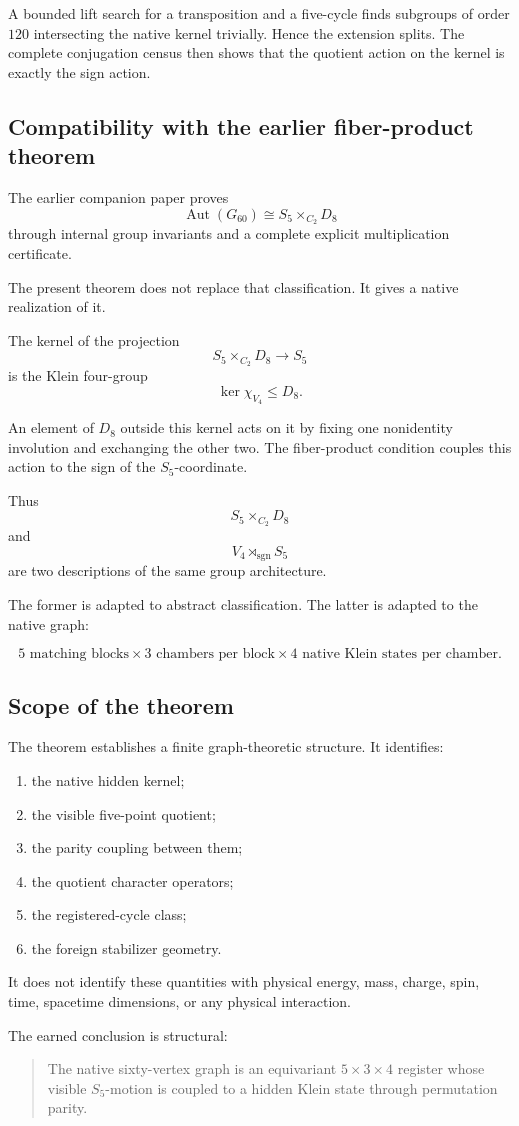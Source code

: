 A bounded lift search for a transposition and a five-cycle finds
subgroups of order \(120\) intersecting the native kernel trivially.
Hence the extension splits. The complete conjugation census then
shows that the quotient action on the kernel is exactly the sign
action.

\subsection{Compatibility with the earlier fiber-product theorem}

The earlier companion paper proves
\[
\operatorname{Aut}(G_{60})
\cong
S_5\times_{C_2}D_8
\]
through internal group invariants and a complete explicit
multiplication certificate.

The present theorem does not replace that classification. It gives a
native realization of it.

The kernel of the projection
\[
S_5\times_{C_2}D_8
\longrightarrow
S_5
\]
is the Klein four-group
\[
\ker\chi_{V_4}\leq D_8.
\]

An element of \(D_8\) outside this kernel acts on it by fixing one
nonidentity involution and exchanging the other two. The fiber-product
condition couples this action to the sign of the \(S_5\)-coordinate.

Thus
\[
S_5\times_{C_2}D_8
\]
and
\[
V_4\rtimes_{\operatorname{sgn}}S_5
\]
are two descriptions of the same group architecture.

The former is adapted to abstract classification. The latter is
adapted to the native graph:

\[
\boxed{
5\text{ matching blocks}
\times
3\text{ chambers per block}
\times
4\text{ native Klein states per chamber}.
}
\]

\subsection{Scope of the theorem}

The theorem establishes a finite graph-theoretic structure. It
identifies:

\begin{enumerate}
    \item the native hidden kernel;
    \item the visible five-point quotient;
    \item the parity coupling between them;
    \item the quotient character operators;
    \item the registered-cycle class;
    \item the foreign stabilizer geometry.
\end{enumerate}

It does not identify these quantities with physical energy, mass,
charge, spin, time, spacetime dimensions, or any physical interaction.

The earned conclusion is structural:

\begin{quote}
The native sixty-vertex graph is an equivariant
\(5\times3\times4\) register whose visible \(S_5\)-motion is coupled
to a hidden Klein state through permutation parity.
\end{quote}
